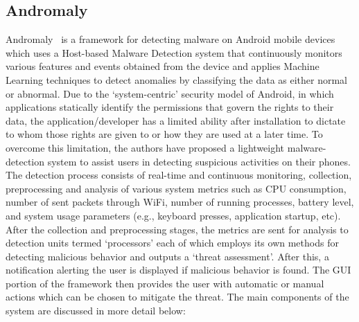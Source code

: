 \documentclass[11pt]{article}
\begin{document}
	\subsection{Andromaly}
	Andromaly~\cite{shabtai2012andromaly} is a framework for detecting malware on Android mobile devices which uses a Host-based Malware Detection system that continuously monitors various features and events obtained from the device and applies Machine Learning techniques to detect anomalies by classifying the data as either normal or abnormal. Due to the ‘system-centric’ security model of Android, in which applications statically identify the permissions that govern the rights to their data, the application/developer has a limited ability after installation to dictate to whom those rights are given to or how they are used at a later time. To overcome this limitation, the authors have proposed a lightweight malware-detection system to assist users in detecting suspicious activities on their phones. 
	The detection process consists of real-time and continuous monitoring, collection, preprocessing and analysis of various system metrics such as CPU consumption, number of sent packets through WiFi, number of running processes, battery level, and system usage parameters (e.g., keyboard presses, application startup, etc). After the collection and preprocessing stages, the metrics are sent for analysis to detection units termed ‘processors’ each of which employs its own methods for detecting malicious behavior and outputs a ‘threat assessment’. After this, a notification alerting the user is displayed if malicious behavior is found. The GUI portion of the framework then provides the user with automatic or manual actions which can be chosen to mitigate the threat.
	The main components of the system are discussed in more detail below:
\end{document}
